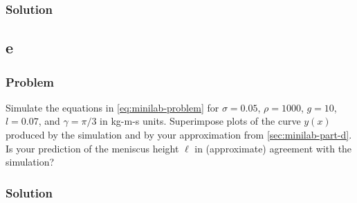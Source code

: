 \documentclass[12pt,twoside]{article}
\begin{document}
\subsubsection*{Solution}
\todo{}

\subsection{e}
\subsubsection*{Problem}
Simulate the equations in \cref{eq:minilab-problem} for $\sigma=0.05$,
$\rho=1000$, $g=10$, $l=0.07$, and $\gamma=\pi/3$ in kg-m-s units. Superimpose
plots of the curve $y(x)$ produced by the simulation and by your approximation
from \cref{sec:minilab-part-d}. Is your prediction of the meniscus height $\ell$
in (approximate) agreement with the simulation?
\subsubsection*{Solution}
\todo{}
\end{document}
